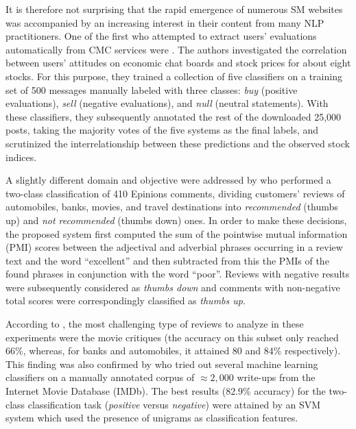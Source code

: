 It is therefore not surprising that the rapid emergence of numerous SM
websites was accompanied by an increasing interest in their content
from many NLP practitioners.  One of the first who attempted to
extract users' evaluations automatically from CMC services were
\citet{Das:01}.  The authors investigated the correlation between
users' attitudes on economic chat boards and stock prices for about
eight stocks.  For this purpose, they trained a collection of five
classifiers on a training set of 500 messages manually labeled with
three classes: \emph{buy} (positive evaluations), \emph{sell}
(negative evaluations), and \emph{null} (neutral statements).  With
these classifiers, they subsequently annotated the rest of the
downloaded 25,000 posts, taking the majority votes of the five systems
as the final labels, and scrutinized the interrelationship between
these predictions and the observed stock indices.


A slightly different domain and objective were addressed by
\citet{Turney:02} who performed a two-class classification of 410
Epinions comments, dividing customers' reviews of automobiles, banks,
movies, and travel destinations into \emph{recommended} (thumbs up)
and \emph{not recommended} (thumbs down) ones.  In order to make these
decisions, the proposed system first computed the sum of the pointwise
mutual information (PMI) scores between the adjectival and adverbial
phrases occurring in a review text and the word ``excellent'' and then
subtracted from this the PMIs of the found phrases in conjunction with
the word ``poor''.  Reviews with negative results were subsequently
considered as \emph{thumbs down} and comments with non-negative total
scores were correspondingly classified as \emph{thumbs up}.

According to \citet{Turney:02}, the most challenging type of reviews
to analyze in these experiments were the movie critiques (the accuracy
on this subset only reached 66\%, whereas, for banks and automobiles,
it attained 80 and 84\% respectively).  This finding was also
confirmed by \citet{Pang:02} who tried out several machine learning
classifiers on a manually annotated corpus of $\approx2,000$ write-ups
from the Internet Movie Database (IMDb).  The best results (82.9\%
accuracy) for the two-class classification task (\emph{positive}
versus \emph{negative}) were attained by an SVM system which used the
presence of unigrams as classification features.


